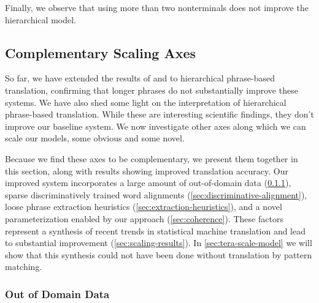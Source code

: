 Finally, we observe that using more than two nonterminals does
not improve the hierarchical model.

\subsection{Complementary Scaling Axes}\label{sec:scaling-works}

So far, we have extended the results of \citet{Zens:2007:hlt-naacl}
and \citet{Koehn:2003:naacl} to hierarchical phrase-based
translation, confirming that longer phrases do not substantially
improve these systems.  We have also shed some light on the
interpretation of hierarchical phrase-based translation.
While these are interesting scientific
findings, they don't improve our baseline system.
We now investigate other axes
along which we can scale our models, some obvious and some novel.

Because we find these axes to be complementary, we present
them together in this section, along with results 
showing improved translation
accuracy.  Our improved system incorporates a large amount of 
out-of-domain data (\textsection\ref{sec:out-of-domain}),
sparse discriminatively trained word alignments 
(\textsection\ref{sec:discriminative-alignment}),
loose phrase extraction heuristics 
(\textsection\ref{sec:extraction-heuristics}), and 
a novel parameterization enabled by our approach
(\textsection\ref{sec:coherence}).  These factors
represent a synthesis of recent trends in statistical
machine translation and lead to substantial improvement
(\textsection\ref{sec:scaling-results}).  
In \textsection\ref{sec:tera-scale-model} we will show
that this synthesis could not have been done without 
translation by pattern matching.

\subsubsection{Out of Domain Data}\label{sec:out-of-domain}

